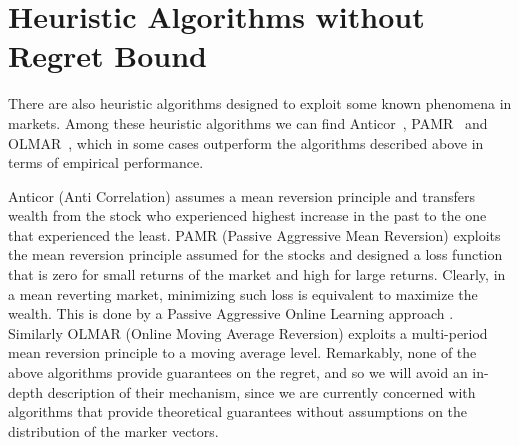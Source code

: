 
\section{Heuristic Algorithms without Regret Bound}

There are also heuristic algorithms designed to exploit some known phenomena in markets. Among these heuristic algorithms we can find Anticor~\cite{borodin2004can}, PAMR~\cite{li2012pamr} and OLMAR~\cite{li2015moving}, which in some cases outperform the algorithms described above in terms of empirical performance. 

Anticor (Anti Correlation) assumes a mean reversion principle and transfers wealth from the stock who experienced highest increase in the past to the one that experienced the least. PAMR (Passive Aggressive Mean Reversion) exploits the mean reversion principle assumed for the stocks and designed a loss function that is zero for small returns of the market and high for large returns. Clearly, in a mean reverting market, minimizing such loss is equivalent to maximize the wealth. This is done by a Passive Aggressive Online Learning approach \cite{crammer2006online}. Similarly OLMAR (Online Moving Average Reversion) exploits a multi-period mean reversion principle to a moving average level. 
Remarkably, none of the above algorithms provide guarantees on the regret, and so we will avoid an in-depth description of their mechanism, since we are currently concerned with algorithms that provide theoretical guarantees without assumptions on the distribution of the marker vectors.